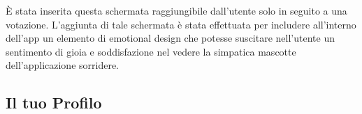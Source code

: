 È stata inserita questa schermata raggiungibile dall'utente solo in seguito a una votazione. L'aggiunta di tale schermata è stata effettuata per includere all'interno dell'app un elemento di emotional design che potesse suscitare nell'utente un sentimento di gioia e soddisfazione nel vedere la simpatica mascotte dell'applicazione sorridere.

\subsection{Il tuo Profilo}

\begin{figure}[htp]
    \centering
     \quad
     \quad

\end{figure}
